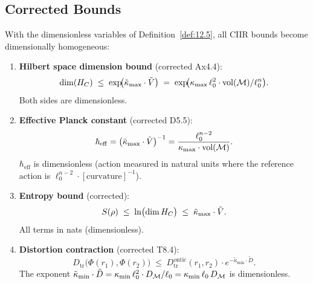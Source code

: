 \subsection{Corrected Bounds}

\begin{theorem}\label{thm:12.2}
With the dimensionless variables of Definition~\ref{def:12.5}, all CIIR
bounds become dimensionally homogeneous:

\begin{enumerate}
  \item \textbf{Hilbert space dimension bound} (corrected Ax4.4):
  \begin{equation}\label{eq:dim-bound}
    \dim(H_C) \;\leq\; \exp\!\bigl(\tilde{\kappa}_{\max} \cdot \tilde{V}\bigr)
    \;=\; \exp\!\bigl(\kappa_{\max}\,\ell_0^2 \cdot \mathrm{vol}(\mathcal{M})/\ell_0^n\bigr).
  \end{equation}
  Both sides are dimensionless.

  \item \textbf{Effective Planck constant} (corrected D5.5):
  \begin{equation}\label{eq:hbar-eff}
    \hbar_{\mathrm{eff}} = \bigl(\tilde{\kappa}_{\max} \cdot \tilde{V}\bigr)^{-1}
    = \frac{\ell_0^{n-2}}{\kappa_{\max} \cdot \mathrm{vol}(\mathcal{M})}.
  \end{equation}
  $\hbar_{\mathrm{eff}}$ is dimensionless (action measured in natural units
  where the reference action is $\ell_0^{n-2} \cdot [\text{curvature}]^{-1}$).

  \item \textbf{Entropy bound} (corrected):
  \begin{equation}\label{eq:entropy-bound}
    S(\rho) \;\leq\; \ln\bigl(\dim H_C\bigr)
    \;\leq\; \tilde{\kappa}_{\max} \cdot \tilde{V}.
  \end{equation}
  All terms in nats (dimensionless).

  \item \textbf{Distortion contraction} (corrected T8.4):
  \begin{equation}\label{eq:distortion-contraction}
    D_{\mathrm{tr}}\bigl(\Phi(r_1), \Phi(r_2)\bigr)
    \;\leq\;
    D_{\mathrm{tr}}^{\mathrm{ontic}}(r_1, r_2)
    \cdot e^{-\tilde{\kappa}_{\min} \cdot \tilde{D}}.
  \end{equation}
  The exponent $\tilde{\kappa}_{\min} \cdot \tilde{D}
  = \kappa_{\min}\,\ell_0^2 \cdot D_{\mathcal{M}}/\ell_0 = \kappa_{\min}\,\ell_0\,D_{\mathcal{M}}$
  is dimensionless.


\end{enumerate}
\end{theorem}
